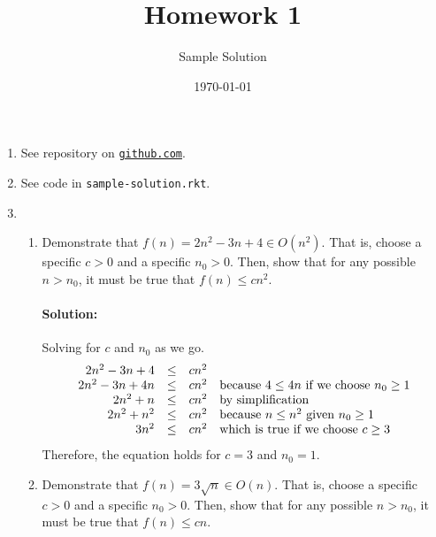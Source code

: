\documentclass{article}
\title{Homework 1}
\author{Sample Solution}
\date{\today}
\begin{document}
\maketitle

\newcommand\link[2][http://]{\href{#1#2}{\nolinkurl{#2}}}
\newcommand\http[1]{\link[http://]{#1}}
\newcommand\https[1]{\link[https://]{#1}}
\newcommand\email[1]{\link[mailto:]{#1}}

\begin{enumerate}

\pagebreak[1]
\item See repository on \link{github.com}.

\pagebreak[1]
\item See code in \texttt{sample-solution.rkt}.

\pagebreak[1]
\item

  \begin{enumerate}

    \pagebreak[1]
  \item Demonstrate that
    \(f(n) = 2n^2 - 3n + 4 \in O(n^2)\).
    That is, choose a specific \(c>0\) and a specific \(n_0 > 0\).
    Then, show that for any possible \(n > n_0\), it must be true that
    \(f(n) \leq c n^2\).

    \paragraph{Solution:} Solving for \(c\) and \(n_0\) as we go.
    \[
    \begin{array}{rcll}
      2n^2 - 3n + 4 &\leq& cn^2 \\
      2n^2 - 3n + 4n &\leq& cn^2
      & $because $ 4 \leq 4n $ if we choose $ n_0 \geq 1 \\
      2n^2 + n &\leq& cn^2
      & $by simplification$ \\
      2n^2 + n^2 &\leq& cn^2
      & $because $ n \leq n^2 $ given $ n_0 \geq 1 \\
      3n^2 &\leq& cn^2
      & $which is true if we choose $ c \geq 3
    \end{array}
    \]
    Therefore, the equation holds for \(c=3\) and \(n_0=1\).

    \bigskip

    \pagebreak[1]
  \item Demonstrate that
    \(f(n) = 3 \sqrt{n} \in O(n)\).
    That is, choose a specific \(c>0\) and a specific \(n_0 > 0\).
    Then, show that for any possible \(n > n_0\), it must be true that
    \(f(n) \leq c n\).


\end{enumerate}
\end{enumerate}
\end{document}
